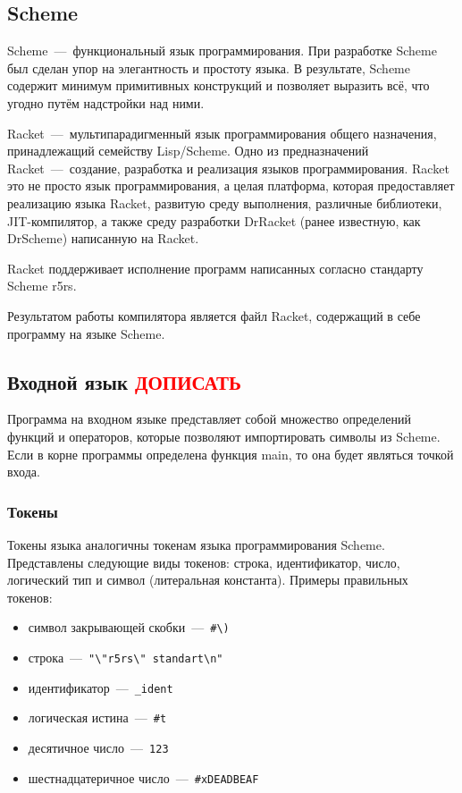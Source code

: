 \documentclass[12pt,a4paper,oneside]{extarticle}
\begin{document}
    \subsection{Scheme}
        Scheme~---~функциональный язык программирования.
        При разработке Scheme был сделан упор на элегантность и простоту языка.
        В результате, Scheme содержит минимум примитивных конструкций и позволяет выразить всё, что угодно путём надстройки над ними.

        Racket~---~мультипарадигменный язык программирования общего назначения, принадлежащий семейству Lisp/Scheme.
        Одно из предназначений Racket~---~создание, разработка и реализация языков программирования.
        Racket это не просто язык программирования, а целая платформа, которая предоставляет реализацию языка Racket, развитую среду выполнения, различные библиотеки, JIT-компилятор, а также среду разработки DrRacket (ранее известную, как DrScheme) написанную на Racket.

        Racket поддерживает исполнение программ написанных согласно стандарту Scheme r5rs.

        Результатом работы компилятора является файл Racket, содержащий в себе программу на языке Scheme.
    \clearpage

    \subsection{Входной язык \textcolor{red}{ДОПИСАТЬ}}
        Программа на входном языке представляет собой множество определений функций и операторов, которые позволяют импортировать символы из Scheme.
        Если в корне программы определена функция main, то она будет являться точкой входа.


        \subsubsection{Токены}
            Токены языка аналогичны токенам языка программирования Scheme.
            Представлены следующие виды токенов: строка, идентификатор, число, логический тип и символ (литеральная константа). Примеры правильных токенов: 

            \begin{itemize}
                \item символ закрывающей скобки~---~\lstinline$#\)$
                \item строка~---~\lstinline$"\"r5rs\" standart\n"$
                \item идентификатор~---~\lstinline$_ident$
                \item логическая истина~---~\lstinline$#t$
                \item десятичное число~---~\lstinline$123$
                \item шестнадцатеричное число~---~\lstinline$#xDEADBEAF$
            \end{itemize}
\end{document}
